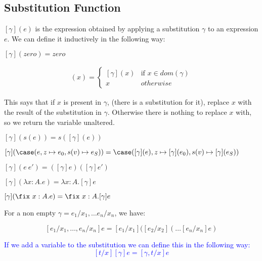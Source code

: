 \vspace{0.5cm}

\subsection{Substitution Function}
$[\gamma](e)$ is the expression obtained by applying a substitution $\gamma$ to an expression $e$. We can define it inductively in the following way:

\begin{adjustwidth}{2cm}{}
$[\gamma](zero) = zero$
\end{adjustwidth}

\begin{minipage}{3.5in}
\begin{align*}
[\gamma](x) = 
  \begin{cases} 
           [\gamma](x) & \text{if } x \in dom(\gamma) \\
           x & otherwise 
  \end{cases}
\end{align*} 
\end{minipage}

This says that if $x$ is present in $\gamma$, (there is a substitution for it), replace $x$ with the result of the substitution in $\gamma$. Otherwise there is nothing to replace $x$ with, so we return the variable unaltered. 

\vspace{0.5cm}

\begin{adjustwidth}{2cm}{}

$[\gamma](s(e)) = s([\gamma] (e))$

$[\gamma](\case (e, z \mapsto e_0, s(v) \mapsto e_S)) = \case ([\gamma](e), z \mapsto [\gamma](e_0), s(v) \mapsto [\gamma](e_S))$

$[\gamma](e \ e') = ([\gamma] e) ([\gamma] e')$

$[\gamma] (\lambda x:A. e) = \lambda x:A. [\gamma] e$

$[\gamma] (\fix \ x:A. e) = \fix \ x:A. [\gamma] e$
\end{adjustwidth}

\vspace{0.5cm}

For a non empty $\gamma = e_1/x_1, \dots e_n/x_n$, we have:

\[ [e_1/x_1, \dots , e_n/x_n] e = [e_1/x_1]([e_2/x_2]( \dots [e_n/x_n] e) \]

\textcolor{blue}{If we add a variable to the substitution we can define this in the following way:
\[ [t/x][\gamma] e = [\gamma, t/x] e \]}

